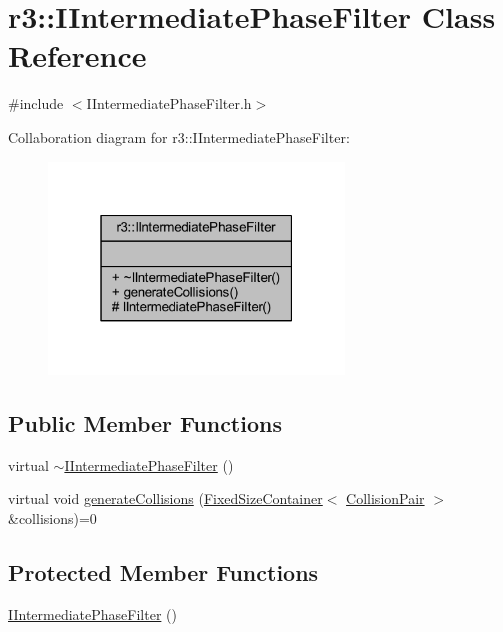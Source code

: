 \hypertarget{classr3_1_1_i_intermediate_phase_filter}{}\section{r3\+:\+:I\+Intermediate\+Phase\+Filter Class Reference}
\label{classr3_1_1_i_intermediate_phase_filter}


{\ttfamily \#include $<$I\+Intermediate\+Phase\+Filter.\+h$>$}



Collaboration diagram for r3\+:\+:I\+Intermediate\+Phase\+Filter\+:\nopagebreak
\begin{figure}[H]
\begin{center}
\leavevmode
\includegraphics[width=223pt]{classr3_1_1_i_intermediate_phase_filter__coll__graph}
\end{center}
\end{figure}
\subsection*{Public Member Functions}
\begin{DoxyCompactItemize}
\item 
virtual \mbox{\hyperlink{classr3_1_1_i_intermediate_phase_filter_ab2257ec90263c444371f455078e5ff7c}{$\sim$\+I\+Intermediate\+Phase\+Filter}} ()
\item 
virtual void \mbox{\hyperlink{classr3_1_1_i_intermediate_phase_filter_a0b235161317095e134661aa49beb909d}{generate\+Collisions}} (\mbox{\hyperlink{classr3_1_1_fixed_size_container}{Fixed\+Size\+Container}}$<$ \mbox{\hyperlink{classr3_1_1_collision_pair}{Collision\+Pair}} $>$ \&collisions)=0
\end{DoxyCompactItemize}
\subsection*{Protected Member Functions}
\begin{DoxyCompactItemize}
\item 
\mbox{\hyperlink{classr3_1_1_i_intermediate_phase_filter_a22779c8595810d4068bfaaa140e39e0b}{I\+Intermediate\+Phase\+Filter}} ()
\end{DoxyCompactItemize}


